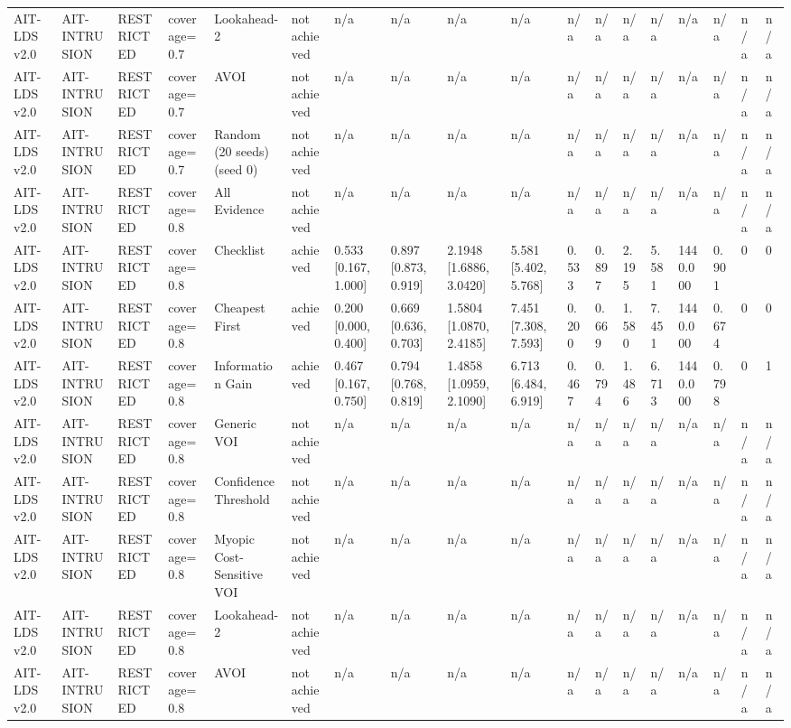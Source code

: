 \begin{table}[!ht]
{\begin{tabular}{llllllllllllllllll}
AIT-LDS v2.0 & AIT-INTRUSION & RESTRICTED & coverage=0.7 & Lookahead-2 & not achieved & n/a & n/a & n/a & n/a & n/a & n/a & n/a & n/a & n/a & n/a & n/a & n/a \\
AIT-LDS v2.0 & AIT-INTRUSION & RESTRICTED & coverage=0.7 & AVOI & not achieved & n/a & n/a & n/a & n/a & n/a & n/a & n/a & n/a & n/a & n/a & n/a & n/a \\
AIT-LDS v2.0 & AIT-INTRUSION & RESTRICTED & coverage=0.7 & Random (20 seeds) (seed 0) & not achieved & n/a & n/a & n/a & n/a & n/a & n/a & n/a & n/a & n/a & n/a & n/a & n/a \\
AIT-LDS v2.0 & AIT-INTRUSION & RESTRICTED & coverage=0.8 & All Evidence & not achieved & n/a & n/a & n/a & n/a & n/a & n/a & n/a & n/a & n/a & n/a & n/a & n/a \\
AIT-LDS v2.0 & AIT-INTRUSION & RESTRICTED & coverage=0.8 & Checklist & achieved & 0.533 [0.167, 1.000] & 0.897 [0.873, 0.919] & 2.1948 [1.6886, 3.0420] & 5.581 [5.402, 5.768] & 0.533 & 0.897 & 2.195 & 5.581 & 1440.000 & 0.901 & 0 & 0 \\
AIT-LDS v2.0 & AIT-INTRUSION & RESTRICTED & coverage=0.8 & Cheapest First & achieved & 0.200 [0.000, 0.400] & 0.669 [0.636, 0.703] & 1.5804 [1.0870, 2.4185] & 7.451 [7.308, 7.593] & 0.200 & 0.669 & 1.580 & 7.451 & 1440.000 & 0.674 & 0 & 0 \\
AIT-LDS v2.0 & AIT-INTRUSION & RESTRICTED & coverage=0.8 & Information Gain & achieved & 0.467 [0.167, 0.750] & 0.794 [0.768, 0.819] & 1.4858 [1.0959, 2.1090] & 6.713 [6.484, 6.919] & 0.467 & 0.794 & 1.486 & 6.713 & 1440.000 & 0.798 & 0 & 1 \\
AIT-LDS v2.0 & AIT-INTRUSION & RESTRICTED & coverage=0.8 & Generic VOI & not achieved & n/a & n/a & n/a & n/a & n/a & n/a & n/a & n/a & n/a & n/a & n/a & n/a \\
AIT-LDS v2.0 & AIT-INTRUSION & RESTRICTED & coverage=0.8 & Confidence Threshold & not achieved & n/a & n/a & n/a & n/a & n/a & n/a & n/a & n/a & n/a & n/a & n/a & n/a \\
AIT-LDS v2.0 & AIT-INTRUSION & RESTRICTED & coverage=0.8 & Myopic Cost-Sensitive VOI & not achieved & n/a & n/a & n/a & n/a & n/a & n/a & n/a & n/a & n/a & n/a & n/a & n/a \\
AIT-LDS v2.0 & AIT-INTRUSION & RESTRICTED & coverage=0.8 & Lookahead-2 & not achieved & n/a & n/a & n/a & n/a & n/a & n/a & n/a & n/a & n/a & n/a & n/a & n/a \\
AIT-LDS v2.0 & AIT-INTRUSION & RESTRICTED & coverage=0.8 & AVOI & not achieved & n/a & n/a & n/a & n/a & n/a & n/a & n/a & n/a & n/a & n/a & n/a & n/a \\

\end{tabular}}
\end{table}
